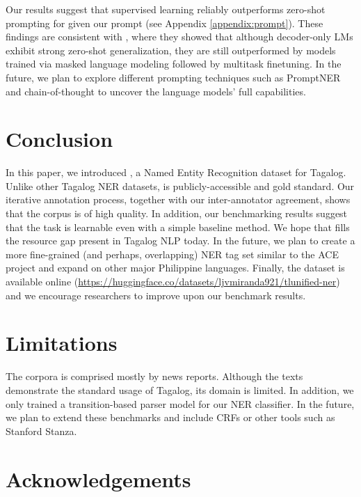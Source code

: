\documentclass[11pt]{article}
\begin{document}


Our results suggest that supervised learning reliably outperforms zero-shot prompting for \tlunified{} given our prompt (see Appendix \ref{appendix:prompt}).
These findings are consistent with \citet{Wang2022WhatLM}, where they showed that although decoder-only LMs exhibit strong zero-shot generalization, they are still outperformed by models trained via masked language modeling followed by multitask finetuning.
In the future, we plan to explore different prompting techniques such as PromptNER \citep{Ashok2023PromptNER} and chain-of-thought \citep{Wei2023CoT} to uncover the language models' full capabilities.

\section{Conclusion}

In this paper, we introduced \tlunified{}, a Named Entity Recognition dataset for Tagalog.
Unlike other Tagalog NER datasets, \tlunified{} is publicly-accessible and gold standard.
Our iterative annotation process, together with our inter-annotator agreement, shows that the corpus is of high quality.
In addition, our benchmarking results suggest that the task is learnable even with a simple baseline method.
We hope that \tlunified{} fills the resource gap present in Tagalog NLP today.
In the future, we plan to create a more fine-grained (and perhaps, overlapping) NER tag set similar to the ACE project and expand on other major Philippine languages.
Finally, the dataset is available online (\url{https://huggingface.co/datasets/ljvmiranda921/tlunified-ner}) and we encourage researchers to improve upon our benchmark results.

\section*{Limitations}

The \tlunified{} corpora is comprised mostly by news reports.
Although the texts demonstrate the standard usage of Tagalog, its domain is limited.
In addition, we only trained a transition-based parser model for our NER classifier.
In the future, we plan to extend these benchmarks and include CRFs or other tools such as Stanford Stanza.

\section*{Acknowledgements}
\end{document}
